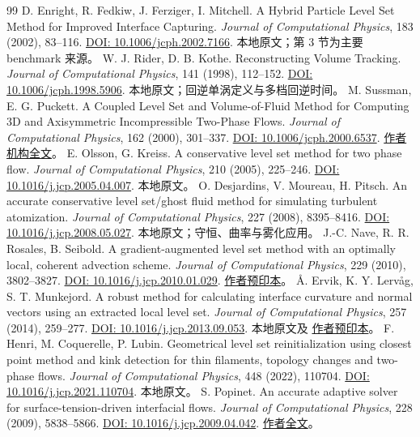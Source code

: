 \documentclass[11pt,a4paper]{article}
\newcommand{\doi}[1]{\href{https://doi.org/#1}{DOI: #1}}
\begin{document}
\clearpage
{}
{}
\begin{thebibliography}{99}
 D. Enright, R. Fedkiw, J. Ferziger, I. Mitchell. A Hybrid Particle Level Set Method for Improved Interface Capturing. \emph{Journal of Computational Physics}, 183 (2002), 83--116. \doi{10.1006/jcph.2002.7166}. 本地原文；第 3 节为主要 benchmark 来源。
 W. J. Rider, D. B. Kothe. Reconstructing Volume Tracking. \emph{Journal of Computational Physics}, 141 (1998), 112--152. \doi{10.1006/jcph.1998.5906}. 本地原文；回逆单涡定义与多档回逆时间。
 M. Sussman, E. G. Puckett. A Coupled Level Set and Volume-of-Fluid Method for Computing 3D and Axisymmetric Incompressible Two-Phase Flows. \emph{Journal of Computational Physics}, 162 (2000), 301--337. \doi{10.1006/jcph.2000.6537}. \href{https://www.math.ucdavis.edu/~egp/PUBLICATIONS/JOURNAL_ARTICLES/APPEARED/2000/MSS-EGP_2000.pdf}{作者机构全文}。
 E. Olsson, G. Kreiss. A conservative level set method for two phase flow. \emph{Journal of Computational Physics}, 210 (2005), 225--246. \doi{10.1016/j.jcp.2005.04.007}. 本地原文。
 O. Desjardins, V. Moureau, H. Pitsch. An accurate conservative level set/ghost fluid method for simulating turbulent atomization. \emph{Journal of Computational Physics}, 227 (2008), 8395--8416. \doi{10.1016/j.jcp.2008.05.027}. 本地原文；守恒、曲率与雾化应用。
 J.-C. Nave, R. R. Rosales, B. Seibold. A gradient-augmented level set method with an optimally local, coherent advection scheme. \emph{Journal of Computational Physics}, 229 (2010), 3802--3827. \doi{10.1016/j.jcp.2010.01.029}. \href{https://arxiv.org/abs/0905.3409}{作者预印本}。
 Å. Ervik, K. Y. Lervåg, S. T. Munkejord. A robust method for calculating interface curvature and normal vectors using an extracted local level set. \emph{Journal of Computational Physics}, 257 (2014), 259--277. \doi{10.1016/j.jcp.2013.09.053}. 本地原文及 \href{https://arxiv.org/abs/1405.0829}{作者预印本}。
 F. Henri, M. Coquerelle, P. Lubin. Geometrical level set reinitialization using closest point method and kink detection for thin filaments, topology changes and two-phase flows. \emph{Journal of Computational Physics}, 448 (2022), 110704. \doi{10.1016/j.jcp.2021.110704}. 本地原文。
 S. Popinet. An accurate adaptive solver for surface-tension-driven interfacial flows. \emph{Journal of Computational Physics}, 228 (2009), 5838--5866. \doi{10.1016/j.jcp.2009.04.042}. \href{https://gerris.dalembert.upmc.fr/papers/tension.pdf}{作者全文}。

\end{thebibliography}
\end{document}
